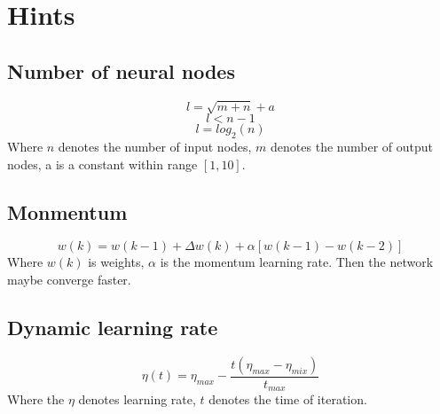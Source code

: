 \documentclass[a4paper,10pt]{article}
\begin{document}
\section{Hints}
	\subsection{Number of neural nodes}
		\[ l = \sqrt{m+n} + a\]
		\[ l < n - 1 \]
		\[ l = log_2 (n) \]
		Where $n$ denotes the number of input nodes, $m$ denotes the number of output nodes, 
		a is a constant within range $[1, 10]$.
	\subsection{Monmentum}
		\[ w(k) = w(k-1) + \Delta w(k) + \alpha [ w(k-1) - w(k-2) ] \]
		Where $w(k)$ is weights, $\alpha$ is the momentum learning rate.
		Then the network maybe converge faster.
	\subsection{Dynamic learning rate}
		\[ \eta(t) = \eta_{max} - \frac{t(\eta_{max} - \eta_{mix})}{t_{max}}  \]
		Where the $\eta$ denotes learning rate, $t$ denotes the time of iteration.
\end{document}
